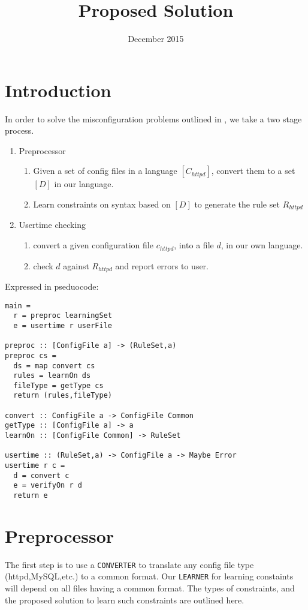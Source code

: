 \documentclass{article}
\title{Proposed Solution}
\author{}
\date{December 2015}
\begin{document}
\maketitle

\section{Introduction}
In order to solve the misconfiguration problems outlined in \cite{yin2011}, we take a two stage process.

\begin{enumerate}
  \item Preprocessor
  \begin{enumerate}
    \item Given a set of config files in a language $[C_{httpd}]$, convert them to a set $[D]$ in our language.
    \item Learn constraints on syntax based on $[D]$ to generate the rule set $R_{httpd}$
  \end{enumerate}
  \item Usertime checking
  \begin{enumerate}
    \item convert a given configuration file $c_{httpd}$, into a file $d$, in our own language.
    \item check $d$ against $R_{httpd}$ and report errors to user.
  \end{enumerate}
\end{enumerate}

Expressed in pseduocode:

\begin{lstlisting}
main = 
  r = preproc learningSet
  e = usertime r userFile

preproc :: [ConfigFile a] -> (RuleSet,a)
preproc cs =
  ds = map convert cs 
  rules = learnOn ds
  fileType = getType cs
  return (rules,fileType)

convert :: ConfigFile a -> ConfigFile Common
getType :: [ConfigFile a] -> a
learnOn :: [ConfigFile Common] -> RuleSet

usertime :: (RuleSet,a) -> ConfigFile a -> Maybe Error
usertime r c =
  d = convert c
  e = verifyOn r d
  return e
\end{lstlisting}




\section{Preprocessor}
The first step is to use a \texttt{CONVERTER} to translate any config file type (httpd,MySQL,etc.) to a common format. 
Our \texttt{LEARNER} for learning constaints will depend on all files having a common format. 
The types of constraints, and the proposed solution to learn such constraints are outlined here.
\end{document}
